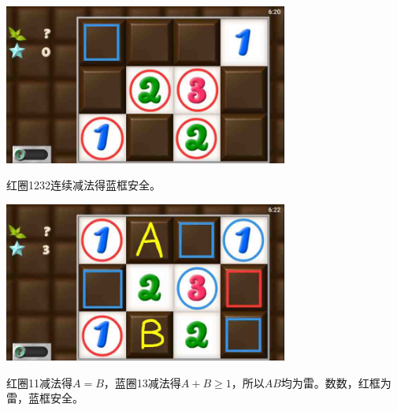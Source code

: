 \subsection{} %
\begin{center}
    \includegraphics[width=0.7\textwidth]{puzzlelow/68-1.jpg}
\end{center}
红圈1232连续减法得蓝框安全。
\begin{center}
    \includegraphics[width=0.7\textwidth]{puzzlelow/68-2.jpg}
\end{center}
红圈11减法得$A=B$，蓝圈13减法得$A+B\ge 1$，所以$AB$均为雷。数数，红框为雷，蓝框安全。


